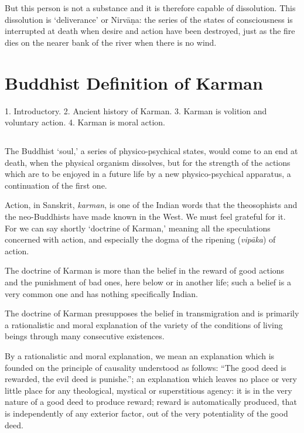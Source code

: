 \documentclass[a4paper, 11pt, oneside, english]{article}
\begin{document}
But this person is not a substance and it is therefore capable of dissolution. This dissolution is `deliverance' or Nirvāṇa: the series of the states of consciousness is interrupted at death when desire and action have been destroyed, just as the fire dies on the nearer bank of the river when there is no wind.
\clearpage
\section{Buddhist Definition of Karman}
\begin{center}\footnotesize
1. Introductory. 2. Ancient history of Karman. 3. Karman is volition and voluntary action. 4. Karman is moral action.
\end{center}
\subsection{}
\paragraph{}
The Buddhist `soul,' a series of physico-psychical states, would come to an end at death, when the physical organism dissolves, but for the strength of the actions which are to be enjoyed in a future life by a new physico-psychical apparatus, a continuation of the first one.

Action, in Sanskrit, \emph{karman}, is one of the Indian words that the theosophists and the neo-Buddhists have made known in the West. We must feel grateful for it. For we can say shortly `doctrine of Karman,' meaning all the speculations concerned with action, and especially the dogma of the ripening (\emph{vipāka}) of action.

The doctrine of Karman is more than the belief in the reward of good actions and the punishment of bad ones, here below or in another life; such a belief is a very common one and has nothing specifically Indian.

The doctrine of Karman presupposes the belief in transmigration and is primarily a rationalistic and moral explanation of the variety of the conditions of living beings through many consecutive existences.

By a rationalistic and moral explanation, we mean an explanation which is founded on the principle of causality understood as follows: ``The good deed is rewarded, the evil deed is punishe.''; an explanation which leaves no place or very little place for any theological, mystical or superstitious agency: it is in the very nature of a good deed to produce reward; reward is automatically produced, that is independently of any exterior factor, out of the very potentiality of the good deed.
\end{document}
